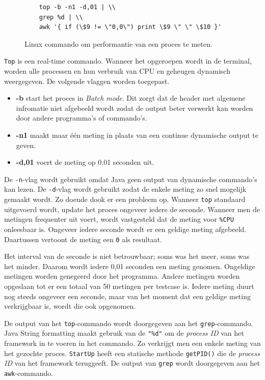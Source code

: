 \begin{figure}
\centering
\begin{verbatim}
	top -b -n1 -d,01 | \\
	grep %d | \\
	awk '{ if (\$9 != \"0,0\") print \$9 \" \" \$10 }'
\end{verbatim}
\caption{Linux commando om performantie van een proces te meten.}
\label{command}
\end{figure}

\verb+Top+ is een real-time commando. Wanneer het opgeroepen wordt in de terminal, worden alle processen en hun verbruik van CPU en geheugen dynamisch weergegeven. \autocite{topcommand} De volgende vlaggen worden toegepast.

\begin{itemize}
	\item \textbf{-b} start het proces in \textit{Batch mode}. Dit zorgt dat de header met algemene infromatie niet afgebeeld wordt zodat de output beter verwerkt kan worden door andere programma's of commando's.
	\item \textbf{-n1} maakt maar één meting in plaats van een continue dynamische output te geven.
	\item \textbf{-d,01} voert de meting op 0,01 seconden uit.
\end{itemize}

De \verb+-n+-vlag wordt gebruikt omdat Java geen output van dynamische commando's kan lezen. De \verb+-d+-vlag wordt gebruikt zodat de enkele meting zo snel mogelijk gemaakt wordt. Zo doende dook er een probleem op. Wanneer \verb+top+ standaard uitgevoerd wordt, update het proces ongeveer iedere de seconde. Wanneer men de metingen frequenter uit voert, wordt vastgesteld dat de meting voor \verb+%CPU+ onleesbaar is. Ongeveer iedere seconde wordt er een geldige meting afgebeeld. Daartussen vertoont de meting een \verb+0+ als resultaat.

Het interval van de seconde is niet betrouwbaar; soms was het meer, soms was het minder. Daarom wordt iedere 0,01 seconden een meting genomen. Ongeldige metingen worden genegeerd door het programma. Andere metingen worden opgeslaan tot er een totaal van 50 metingen per testcase is. Iedere meting duurt nog steeds ongeveer een seconde, maar van het moment dat een geldige meting verkrijgbaar is, wordt die ook opgenomen. 

De output van het \verb+top+-commando wordt doorgegeven aan het \verb+grep+-commando. Java String formatting maakt gebruik van de \verb|"%d"| om de \textit{process ID} van het framework in te voeren in het commando. Zo verkrijgt men een enkele meting van het gezochte proces. \verb+StartUp+ heeft een statische methode \verb+getPID()+ die de \textit{process ID} van het framework teruggeeft. De output van \verb+grep+ wordt doorgegeven aan het \verb+awk+-commando.

